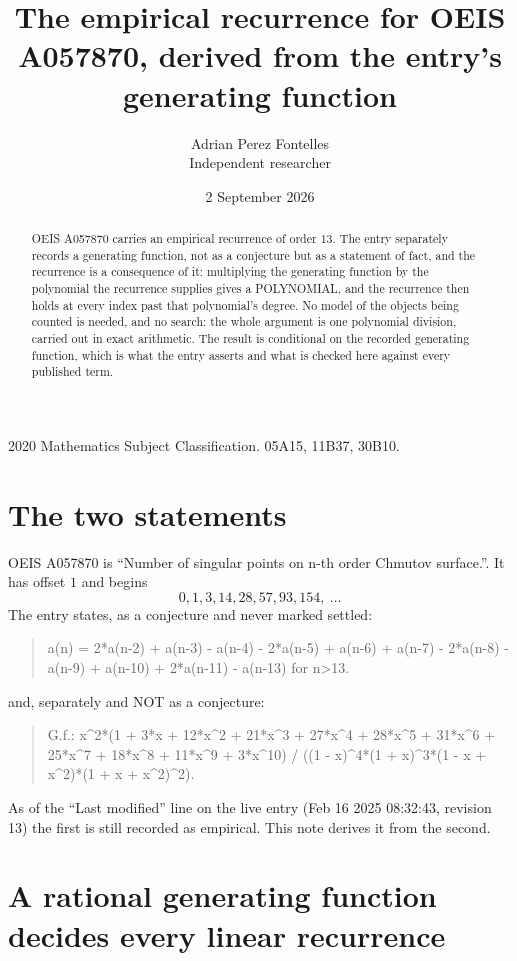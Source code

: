 \documentclass[11pt,a4paper]{article}
\title{The empirical recurrence for OEIS A057870, derived from the entry's generating function}
\author{Adrian Perez Fontelles\\ \small Independent researcher}
\date{2 September 2026}
\theoremstyle{plain}
\theoremstyle{definition}
\begin{document}
\maketitle

\begin{abstract}
OEIS A057870 carries an empirical recurrence of order $13$. The entry separately records a
generating function, not as a conjecture but as a statement of fact, and the recurrence is a
consequence of it: multiplying the generating function by the polynomial the recurrence
supplies gives a POLYNOMIAL, and the recurrence then holds at every index past that
polynomial's degree. No model of the objects being counted is needed, and no search: the
whole argument is one polynomial division, carried out in exact arithmetic. The result is
conditional on the recorded generating function, which is what the entry asserts and what is
checked here against every published term.
\end{abstract}

\noindent\small 2020 Mathematics Subject Classification. 05A15, 11B37, 30B10.\normalsize

\section{The two statements}

OEIS A057870 is ``Number of singular points on n-th order Chmutov surface.''. It has offset $1$ and begins
\[
0, 1, 3, 14, 28, 57, 93, 154,\ \dots
\]
The entry states, as a conjecture and never marked settled:
\begin{quote}
a(n) = 2*a(n-2) + a(n-3) - a(n-4) - 2*a(n-5) + a(n-6) + a(n-7) - 2*a(n-8) - a(n-9) + a(n-10) + 2*a(n-11) - a(n-13) for n>13.
\end{quote}
and, separately and NOT as a conjecture:
\begin{quote}
G.f.: x\^{}2*(1 + 3*x + 12*x\^{}2 + 21*x\^{}3 + 27*x\^{}4 + 28*x\^{}5 + 31*x\^{}6 + 25*x\^{}7 + 18*x\^{}8 + 11*x\^{}9 + 3*x\^{}10) / ((1 - x)\^{}4*(1 + x)\^{}3*(1 - x + x\^{}2)*(1 + x + x\^{}2)\^{}2).
\end{quote}
As of the ``Last modified'' line on the live entry (Feb 16 2025 08:32:43, revision 13) the first is still
recorded as empirical. This note derives it from the second.

\section{A rational generating function decides every linear recurrence}
\end{document}
